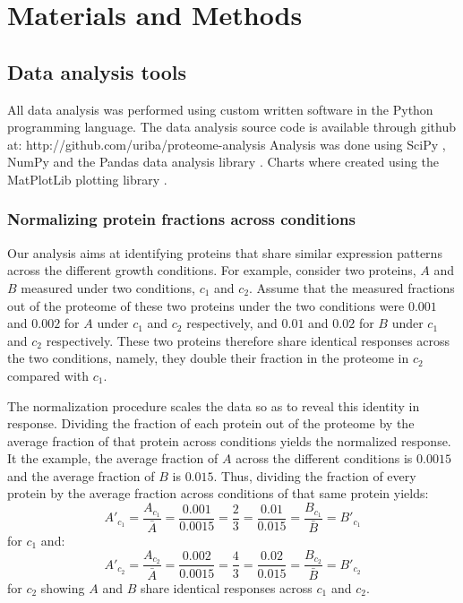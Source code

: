 \documentclass{article}
\begin{document}
\section{Materials and Methods}
\subsection{Data analysis tools}
All data analysis was performed using custom written software in the Python programming language.
The data analysis source code is available through github at: http://github.com/uriba/proteome-analysis
Analysis was done using SciPy \cite{Oliphant2007}, NumPy \cite{Community2011} and the Pandas data analysis library \cite{McKinney2011}.
Charts where created using the MatPlotLib plotting library \cite{Hunter2007}.

\subsubsection{Normalizing protein fractions across conditions}
\label{concacrossconds} 
Our analysis aims at identifying proteins that share similar expression patterns across the different growth conditions.
For example, consider two proteins, $A$ and $B$ measured under two conditions, $c_1$ and $c_2$.
Assume that the measured fractions out of the proteome of these two proteins under the two conditions were $0.001$ and $0.002$ for $A$ under $c_1$ and $c_2$ respectively, and $0.01$ and $0.02$ for $B$ under $c_1$ and $c_2$ respectively.
These two proteins therefore share identical responses across the two conditions, namely, they double their fraction in the proteome in $c_2$ compared with $c_1$.

The normalization procedure scales the data so as to reveal this identity in response.
Dividing the fraction of each protein out of the proteome by the average fraction of that protein across conditions yields the normalized response.
It the example, the average fraction of $A$ across the different conditions is $0.0015$ and the average fraction of $B$ is $0.015$.
Thus, dividing the fraction of every protein by the average fraction across conditions of that same protein yields:
\[
A'_{c_1}=\frac{A_{c_1}}{\bar{A}}=\frac{0.001}{0.0015}=\frac{2}{3}=\frac{0.01}{0.015}=\frac{B_{c_1}}{\bar{B}}=B'_{c_1}
\]
for $c_1$ and:
\[
A'_{c_2}=\frac{A_{c_2}}{\bar{A}}=\frac{0.002}{0.0015}=\frac{4}{3}=\frac{0.02}{0.015}=\frac{B_{c_2}}{\bar{B}}=B'_{c_2}
\]
for $c_2$ showing $A$ and $B$ share identical responses across $c_1$ and $c_2$.
\end{document}
